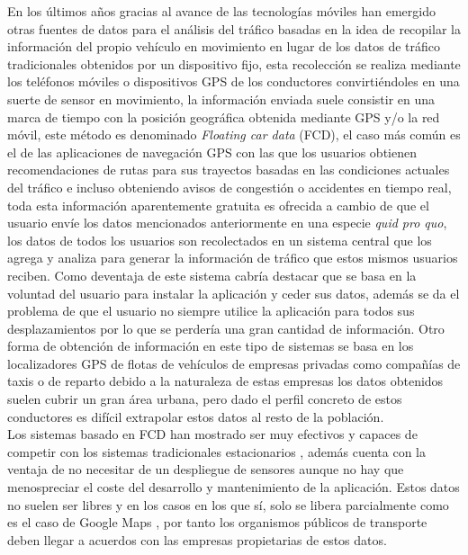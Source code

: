 \documentclass[../proyecto.tex]{subfiles}
\begin{document}
En los últimos años gracias al avance de las tecnologías móviles han emergido otras fuentes de datos para el análisis del tráfico basadas en la idea de recopilar la información del propio vehículo en movimiento en lugar de los datos de tráfico tradicionales obtenidos por un dispositivo fijo, esta recolección se realiza mediante los teléfonos móviles o dispositivos GPS de los conductores convirtiéndoles en una suerte de sensor en movimiento, la información enviada suele consistir en una marca de tiempo con la posición geográfica obtenida mediante GPS y/o la red móvil, este método es denominado \textit{Floating car data} (FCD), el caso más común es el de las aplicaciones de navegación GPS con las que los usuarios obtienen recomendaciones de rutas para sus trayectos basadas en las condiciones actuales del tráfico e incluso obteniendo avisos de congestión o accidentes en tiempo real, toda esta información aparentemente gratuita es ofrecida a cambio de que el usuario envíe los datos mencionados anteriormente en una especie \textit{quid pro quo}, los datos de todos los usuarios son recolectados en un sistema central que los agrega y analiza para generar la información de tráfico que estos mismos usuarios reciben. Como deventaja de este sistema cabría destacar que se basa en la voluntad del usuario para instalar la aplicación y ceder sus datos, además se da el problema de que el usuario no siempre utilice la aplicación para todos sus desplazamientos por lo que se perdería una gran cantidad de información. Otro forma de obtención de información en este tipo de sistemas se basa en los localizadores GPS de flotas de vehículos de empresas privadas como compañías de taxis o de reparto \cite{HUANG2018318} debido a la naturaleza de estas empresas los datos obtenidos suelen cubrir un gran área urbana, pero dado el perfil concreto de estos conductores es difícil extrapolar estos datos al resto de la población.\\

Los sistemas basado en FCD han mostrado ser muy efectivos y capaces de competir con los sistemas tradicionales estacionarios \cite{KESSLER2018299} \cite{NARANJO2010}  \cite{KESSLER2018299} \cite{GUILLAUME2008}, además cuenta con la ventaja de no necesitar de un despliegue de sensores aunque no hay que menospreciar el coste del desarrollo y mantenimiento de la aplicación. Estos datos no suelen ser libres y en los casos en los que sí, solo se libera parcialmente como es el caso de Google Maps \cite{LI20194}, por tanto los organismos públicos de transporte deben llegar a acuerdos con las empresas propietarias de estos datos.\\
\end{document}
